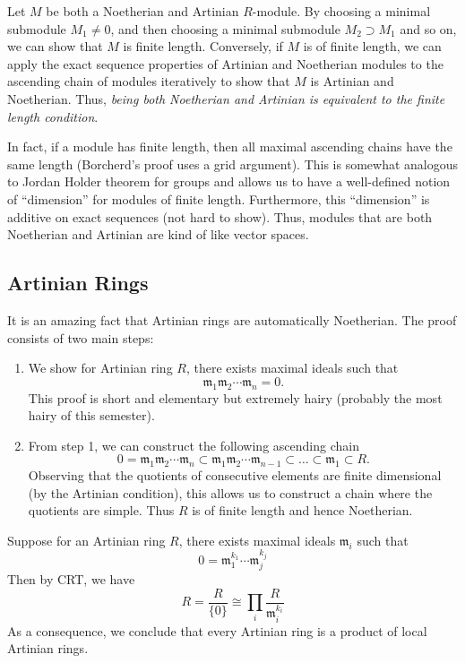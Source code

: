 Let $M$ be both a Noetherian and Artinian $R$-module. By choosing a minimal submodule $M_1 \neq 0$, and then choosing a minimal submodule $M_2 \supset M_1$ and so on, we can show that $M$ is finite length. Conversely, if $M$ is of finite length, we can apply the exact sequence properties of Artinian and Noetherian modules to the ascending chain of modules iteratively to show that $M$ is Artinian and Noetherian. Thus, \textit{being both Noetherian and Artinian is equivalent to the finite length condition}.

In fact, if a module has finite length, then all maximal ascending chains have the same length (Borcherd's proof uses a grid argument). This is somewhat analogous to Jordan Holder theorem for groups and allows us to have a well-defined notion of ``dimension'' for modules of finite length. Furthermore, this ``dimension'' is additive on exact sequences (not hard to show). Thus, modules that are both Noetherian and Artinian are kind of like vector spaces.

\subsection{Artinian Rings}
It is an amazing fact that Artinian rings are automatically Noetherian. The proof consists of two main steps:
\begin{enumerate}
    \item We show for Artinian ring $R$, there exists maximal ideals such that
    \[
        \mathfrak m_1 \mathfrak m_2 \cdots \mathfrak m_n = 0.
    \]
    This proof is short and elementary but extremely hairy (probably the most hairy of this semester).
    \item From step 1, we can construct the following ascending chain
    \[
        0 = \mathfrak m_1 \mathfrak m_2 \cdots \mathfrak m_n \subset 
        \mathfrak m_1 \mathfrak m_2 \cdots \mathfrak m_{n-1} \subset \dots \subset \mathfrak m_1 \subset R.
    \]
    Observing that the quotients of consecutive elements are finite dimensional (by the Artinian condition), this allows us to construct a chain where the quotients are simple. Thus $R$ is of finite length and hence Noetherian.
\end{enumerate}

Suppose for an Artinian ring $R$, there exists maximal ideals $\mathfrak m_i$ such that
\[
    0 = \mathfrak m_1^{k_1}\cdots\mathfrak m_j^{k_j}
\]
Then by CRT, we have
\[
    R = \frac{R}{\{0\}} \cong \prod_i \frac{R}{\mathfrak m_i^{k_i}}
\]
As a consequence, we conclude that every Artinian ring is a product of local Artinian rings.

